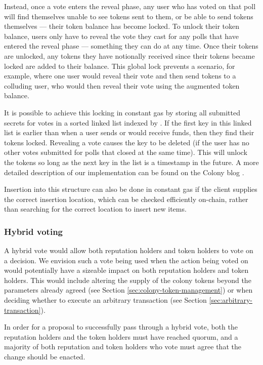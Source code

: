 Instead, once a vote enters the reveal phase, any user who has voted on that poll will find themselves unable to see tokens sent to them, or be able to send tokens themselves --- their token balance has become locked. To unlock their token balance, users only have to reveal the vote they cast for any polls that have entered the reveal phase --- something they can do at any time. Once their tokens are unlocked, any tokens they have notionally received since their tokens became locked are added to their balance. This global lock prevents a scenario, for example, where one user would reveal their vote and then send tokens to a colluding user, who would then reveal their vote using the augmented token balance.

It is possible to achieve this locking in constant gas by storing all submitted secrets for votes in a sorted linked list indexed by . If the first key in this linked list is earlier than  when a user sends or would receive funds, then they find their tokens locked. Revealing a vote causes the key to be deleted (if the user has no other votes submitted for polls that closed at the same time). This will unlock the tokens so long as the next key in the list is a timestamp in the future. A more detailed description of our implementation can be found on the Colony blog \cite{ColonyVoting}.

Insertion into this structure can also be done in constant gas if the client supplies the correct insertion location, which can be checked efficiently on-chain, rather than searching for the correct location to insert new items.

\subsubsection*{Hybrid voting}

A hybrid vote would allow both reputation holders and token holders to vote on a decision. We envision such a vote being used when the action being voted on would potentially have a sizeable impact on both reputation holders and token holders. This would include altering the supply of the colony tokens beyond the parameters already agreed (see Section \ref{sec:colony-token-management}) or when deciding whether to execute an arbitrary transaction (see Section \ref{sec:arbitrary-transaction}).

In order for a proposal to successfully pass through a hybrid vote, both the reputation holders and the token holders must have reached quorum, and a majority of both reputation and token holders who vote must agree that the change should be enacted.

